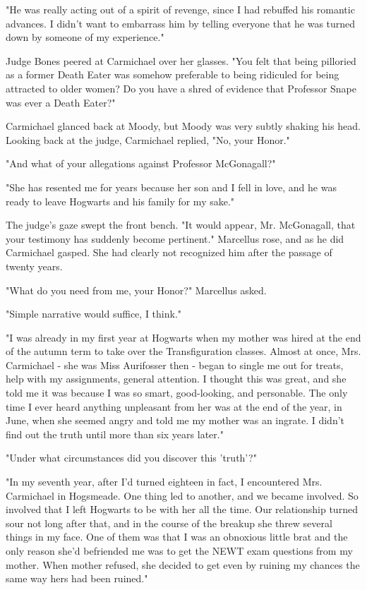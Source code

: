 \documentclass[a4paper,11pt]{article}
\begin{document}
"He was really acting out of a spirit of revenge, since I had rebuffed his romantic advances. I didn't want to embarrass him by telling everyone that he was turned down by someone of my experience."

Judge Bones peered at Carmichael over her glasses. "You felt that being pilloried as a former Death Eater was somehow preferable to being ridiculed for being attracted to older women? Do you have a shred of evidence that Professor Snape was ever a Death Eater?"

Carmichael glanced back at Moody, but Moody was very subtly shaking his head. Looking back at the judge, Carmichael replied, "No, your Honor."

"And what of your allegations against Professor McGonagall?"

"She has resented me for years because her son and I fell in love, and he was ready to leave Hogwarts and his family for my sake."

The judge's gaze swept the front bench. "It would appear, Mr. McGonagall, that your testimony has suddenly become pertinent." Marcellus rose, and as he did Carmichael gasped. She had clearly not recognized him after the passage of twenty years.

"What do you need from me, your Honor?" Marcellus asked.

"Simple narrative would suffice, I think."

"I was already in my first year at Hogwarts when my mother was hired at the end of the autumn term to take over the Transfiguration classes. Almost at once, Mrs. Carmichael - she was Miss Aurifosser then - began to single me out for treats, help with my assignments, general attention. I thought this was great, and she told me it was because I was so smart, good-looking, and personable. The only time I ever heard anything unpleasant from her was at the end of the year, in June, when she seemed angry and told me my mother was an ingrate. I didn't find out the truth until more than six years later."

"Under what circumstances did you discover this 'truth'?"

"In my seventh year, after I'd turned eighteen in fact, I encountered Mrs. Carmichael in Hogsmeade. One thing led to another, and we became involved. So involved that I left Hogwarts to be with her all the time. Our relationship turned sour not long after that, and in the course of the breakup she threw several things in my face. One of them was that I was an obnoxious little brat and the only reason she'd befriended me was to get the NEWT exam questions from my mother. When mother refused, she decided to get even by ruining my chances the same way hers had been ruined."
\end{document}
